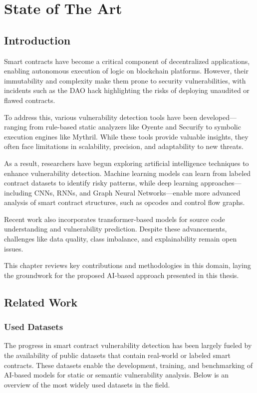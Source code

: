\part{State of The Art}

\chapter{Introduction}
Smart contracts have become a critical component of decentralized applications, enabling autonomous execution of logic on blockchain platforms. However, their immutability and complexity make them prone to security vulnerabilities, with incidents such as the DAO hack highlighting the risks of deploying unaudited or flawed contracts.

To address this, various vulnerability detection tools have been developed—ranging from rule-based static analyzers like Oyente and Securify to symbolic execution engines like Mythril. While these tools provide valuable insights, they often face limitations in scalability, precision, and adaptability to new threats.

As a result, researchers have begun exploring artificial intelligence techniques to enhance vulnerability detection. Machine learning models can learn from labeled contract datasets to identify risky patterns, while deep learning approaches—including CNNs, RNNs, and Graph Neural Networks—enable more advanced analysis of smart contract structures, such as opcodes and control flow graphs.

Recent work also incorporates transformer-based models for source code understanding and vulnerability prediction. Despite these advancements, challenges like data quality, class imbalance, and explainability remain open issues.

This chapter reviews key contributions and methodologies in this domain, laying the groundwork for the proposed AI-based approach presented in this thesis.

\chapter{Related Work}
\section{Used Datasets}
The progress in smart contract vulnerability detection has been largely fueled by the availability of public datasets that contain real-world or labeled smart contracts. These datasets enable the development, training, and benchmarking of AI-based models for static or semantic vulnerability analysis. Below is an overview of the most widely used datasets in the field.

